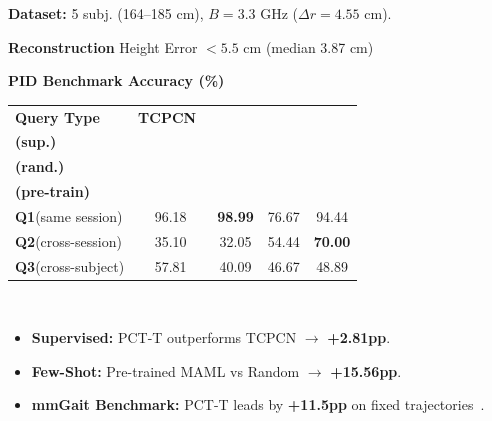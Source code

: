 \documentclass[a0paper,portrait]{tikzposter}
\begin{document}
{\begin{minipage}[t]{0.38\linewidth}
\begin{minipage}[t]{0.4\linewidth}
            \vspace{2mm}
            \textbf{Dataset:} 5 subj. (164--185 cm), $B=3.3$ GHz ($\Delta r=4.55$ cm).
        \end{minipage}

        \vspace{-7mm}

        \colorbox{resultsColor!12}{\parbox{0.98\linewidth}{\centering \textbf{Reconstruction} Height Error \(<5.5\) cm (median 3.87 cm)}}
    \end{minipage}
    \hfill
    \begin{minipage}[t]{0.3\linewidth}
        \vspace{0mm}
        \centering\normalsize
        \textbf{PID Benchmark Accuracy (\%)}\\[2mm]
        \setlength{\tabcolsep}{5pt}
        \renewcommand{\arraystretch}{1.5}
        \begin{tabular}{l c c c c}
            \toprule
            \textbf{Query Type} & \textbf{TCPCN}~\cite{Pegoraro21} & \makecell{\textbf{PCT-T}\\\textbf{(sup.)}} & \makecell{\textbf{MAML}\\\textbf{(rand.)}} & \makecell{\textbf{MAML}\\\textbf{(pre-train)}} \\
            \midrule
            \textbf{Q1}(same session)  & 96.18 & \textbf{98.99} & 76.67 & 94.44 \\
            \textbf{Q2}(cross-session) & 35.10 & 32.05          & 54.44 & \textbf{70.00} \\
            \textbf{Q3}(cross-subject) & 57.81 & 40.09          & 46.67 & 48.89 \\
            \bottomrule
        \end{tabular}\\

        \vspace{4mm}

        \colorbox{resultsColor!12}{\parbox{0.98\linewidth}{
            \raggedright
            \begin{itemize}
                \setlength\itemsep{2mm}
                \item \textbf{Supervised:} PCT-T outperforms TCPCN \(\to\) \textbf{+2.81pp}.
                \item \textbf{Few-Shot:} Pre-trained MAML vs Random \(\to\) \textbf{+15.56pp}.
                \item \textbf{mmGait Benchmark:} PCT-T leads by \textbf{+11.5pp} on fixed trajectories~\cite{Meng20}.
            \end{itemize}
        }}
    \end{minipage}
}
\end{document}
